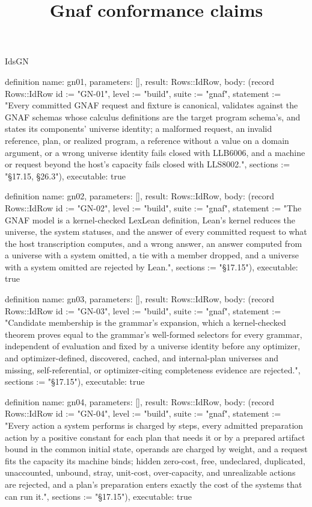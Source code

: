 \begin{lexlean}{IdsGN}
\title{Gnaf conformance claims}
\begin{semanticmodule}
definition{
  name: gn01,
  parameters: [],
  result: Rows::IdRow,
  body: (record Rows::IdRow {id := "GN-01", level := "build", suite := "gnaf", statement := "Every committed GNAF request and fixture is canonical, validates against the GNAF schemas whose calculus definitions are the target program schema's, and states its components' universe identity; a malformed request, an invalid reference, plan, or realized program, a reference without a value on a domain argument, or a wrong universe identity fails closed with LLB6006, and a machine or request beyond the host's capacity fails closed with LLS8002.", sections := "§17.15, §26.3"}),
  executable: true
}

definition{
  name: gn02,
  parameters: [],
  result: Rows::IdRow,
  body: (record Rows::IdRow {id := "GN-02", level := "build", suite := "gnaf", statement := "The GNAF model is a kernel-checked LexLean definition, Lean's kernel reduces the universe, the system statuses, and the answer of every committed request to what the host transcription computes, and a wrong answer, an answer computed from a universe with a system omitted, a tie with a member dropped, and a universe with a system omitted are rejected by Lean.", sections := "§17.15"}),
  executable: true
}

definition{
  name: gn03,
  parameters: [],
  result: Rows::IdRow,
  body: (record Rows::IdRow {id := "GN-03", level := "build", suite := "gnaf", statement := "Candidate membership is the grammar's expansion, which a kernel-checked theorem proves equal to the grammar's well-formed selectors for every grammar, independent of evaluation and fixed by a universe identity before any optimizer, and optimizer-defined, discovered, cached, and internal-plan universes and missing, self-referential, or optimizer-citing completeness evidence are rejected.", sections := "§17.15"}),
  executable: true
}

definition{
  name: gn04,
  parameters: [],
  result: Rows::IdRow,
  body: (record Rows::IdRow {id := "GN-04", level := "build", suite := "gnaf", statement := "Every action a system performs is charged by steps, every admitted preparation action by a positive constant for each plan that needs it or by a prepared artifact bound in the common initial state, operands are charged by weight, and a request fits the capacity its machine binds; hidden zero-cost, free, undeclared, duplicated, unaccounted, unbound, stray, unit-cost, over-capacity, and unrealizable actions are rejected, and a plan's preparation enters exactly the cost of the systems that can run it.", sections := "§17.15"}),
  executable: true
}


\end{semanticmodule}
\end{lexlean}
